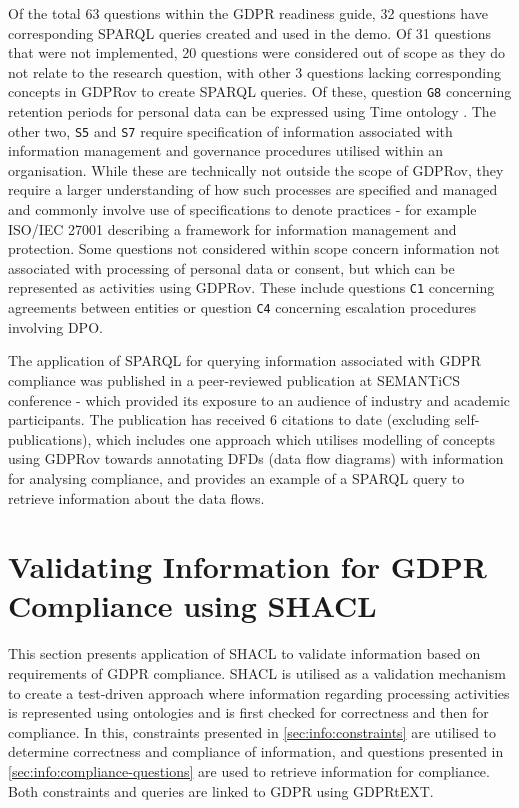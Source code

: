 Of the total 63 questions within the GDPR readiness guide, 32 questions have corresponding SPARQL queries created and used in the demo.
Of 31 questions that were not implemented, 20 questions were considered out of scope as they do not relate to the research question, with other 3 questions lacking corresponding concepts in GDPRov to create SPARQL queries.
Of these, question \texttt{G8} concerning retention periods for personal data can be expressed using Time ontology \cite{cox_time_2017}.
The other two, \texttt{S5} and \texttt{S7} require specification of information associated with information management and governance procedures utilised within an organisation. While these are technically not outside the scope of GDPRov, they require a larger understanding of how such processes are specified and managed and commonly involve use of specifications to denote practices - for example ISO/IEC 27001 describing a framework for information management and protection.
Some questions not considered within scope concern information not associated with processing of personal data or consent, but which can be represented as activities using GDPRov. These include questions \texttt{C1} concerning agreements between entities or question \texttt{C4} concerning escalation procedures involving DPO.

The application of SPARQL for querying information associated with GDPR compliance was published in a peer-reviewed publication \cite{pandit_queryable_2018} at SEMANTiCS conference - which provided its exposure to an audience of industry and academic participants. The publication has received 6 citations to date (excluding self-publications), which includes one approach \cite{debruyneOntologyRepresentingAnnotating2019} which utilises modelling of concepts using GDPRov towards annotating DFDs (data flow diagrams) with information for analysing compliance, and provides an example of a SPARQL query to retrieve information about the data flows.


\section{Validating Information for GDPR Compliance using SHACL}\label{sec:testing:shacl}
This section presents application of SHACL to validate information based on requirements of GDPR compliance.
SHACL is utilised as a validation mechanism to create a test-driven approach where information regarding processing activities is represented using ontologies and is first checked for correctness and then for compliance.
In this, constraints presented in \autoref{sec:info:constraints} are utilised to determine correctness and compliance of information, and questions presented in \autoref{sec:info:compliance-questions} are used to retrieve information for compliance.
Both constraints and queries are linked to GDPR using GDPRtEXT.

